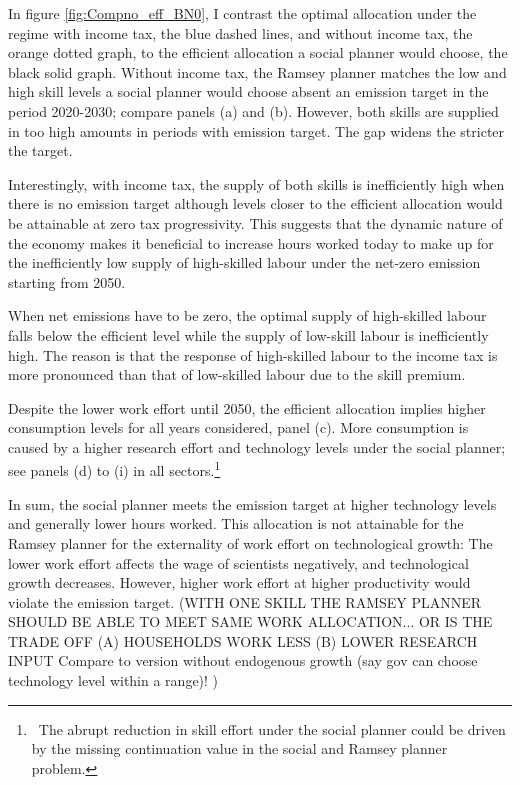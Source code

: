 In figure \ref{fig:Compno_eff_BN0}, I contrast the optimal allocation under the regime with income tax, the blue dashed lines, and without income tax, the orange dotted graph, to the efficient allocation  a social planner would choose, the black solid graph. 
Without income tax, the Ramsey planner matches the low and high skill levels a social planner would choose absent an emission target in the period 2020-2030; compare panels (a) and (b). However, both skills are supplied in too high amounts in periods with emission target. The gap widens the stricter the target. 

Interestingly, with income tax, the supply of both skills is inefficiently high when there is no emission target although levels closer to the efficient allocation would be attainable at zero tax progressivity. This suggests that the dynamic nature of the economy makes it beneficial to increase hours worked today to make up for the inefficiently low supply of high-skilled labour under the net-zero emission starting from 2050. 

When net emissions have to be zero, the optimal supply of high-skilled labour falls below the efficient level while the supply of low-skill labour is inefficiently high. The reason is that the response of high-skilled labour to the income tax is more pronounced than that of low-skilled labour due to the skill premium. 

Despite the lower work effort until 2050, the efficient allocation implies higher consumption levels for all years considered, panel (c). More consumption is caused by a higher research effort and technology levels under the social planner; see panels (d) to (i) in all sectors.\footnote{\ The abrupt reduction in skill effort under the social planner could be driven by the missing continuation value in the social and Ramsey planner problem. }

In sum, the social planner meets the emission target at higher technology levels and generally lower hours worked. This allocation is not attainable for the Ramsey planner for the externality of work effort on technological growth: The lower work effort affects the wage of scientists negatively, and technological growth decreases. However, higher work effort at higher productivity would violate the emission target. 
(WITH ONE SKILL THE RAMSEY PLANNER SHOULD BE ABLE TO MEET SAME WORK ALLOCATION... OR IS THE TRADE OFF (A) HOUSEHOLDS WORK LESS \ar (B) LOWER RESEARCH INPUT \ar Compare to version without endogenous growth (say gov can choose technology level within a range)!
)

